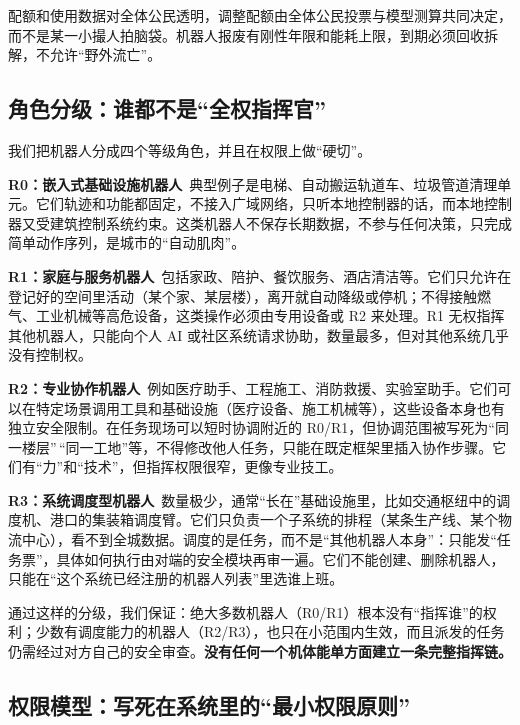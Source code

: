 配额和使用数据对全体公民透明，调整配额由全体公民投票与模型测算共同决定，而不是某一小撮人拍脑袋。机器人报废有刚性年限和能耗上限，到期必须回收拆解，不允许``野外流亡''。

\subsection{角色分级：谁都不是``全权指挥官''}\label{ux89d2ux8272ux5206ux7ea7ux8c01ux90fdux4e0dux662fux5168ux6743ux6307ux6325ux5b98}

我们把机器人分成四个等级角色，并且在权限上做``硬切''。

\textbf{R0：嵌入式基础设施机器人}\,
典型例子是电梯、自动搬运轨道车、垃圾管道清理单元。它们轨迹和功能都固定，不接入广域网络，只听本地控制器的话，而本地控制器又受建筑控制系统约束。这类机器人不保存长期数据，不参与任何决策，只完成简单动作序列，是城市的``自动肌肉''。

\textbf{R1：家庭与服务机器人}\,
包括家政、陪护、餐饮服务、酒店清洁等。它们只允许在登记好的空间里活动（某个家、某层楼），离开就自动降级或停机；不得接触燃气、工业机械等高危设备，这类操作必须由专用设备或 R2 来处理。R1 无权指挥其他机器人，只能向个人 AI 或社区系统请求协助，数量最多，但对其他系统几乎没有控制权。

\textbf{R2：专业协作机器人}\,
例如医疗助手、工程施工、消防救援、实验室助手。它们可以在特定场景调用工具和基础设施（医疗设备、施工机械等），这些设备本身也有独立安全限制。在任务现场可以短时协调附近的 R0/R1，但协调范围被写死为``同一楼层''\,``同一工地''等，不得修改他人任务，只能在既定框架里插入协作步骤。它们有``力''和``技术''，但指挥权限很窄，更像专业技工。

\textbf{R3：系统调度型机器人}\,
数量极少，通常``长在''基础设施里，比如交通枢纽中的调度机、港口的集装箱调度臂。它们只负责一个子系统的排程（某条生产线、某个物流中心），看不到全城数据。调度的是任务，而不是``其他机器人本身''：只能发``任务票''，具体如何执行由对端的安全模块再审一遍。它们不能创建、删除机器人，只能在``这个系统已经注册的机器人列表''里选谁上班。

通过这样的分级，我们保证：绝大多数机器人（R0/R1）根本没有``指挥谁''的权利；少数有调度能力的机器人（R2/R3），也只在小范围内生效，而且派发的任务仍需经过对方自己的安全审查。\textbf{没有任何一个机体能单方面建立一条完整指挥链。}

\subsection{权限模型：写死在系统里的``最小权限原则''}\label{ux6743ux9650ux6a21ux578bux5199ux6b7bux5728ux7cfbux7edfux91ccux7684ux6700ux5c0fux6743ux9650ux539fux5219}

